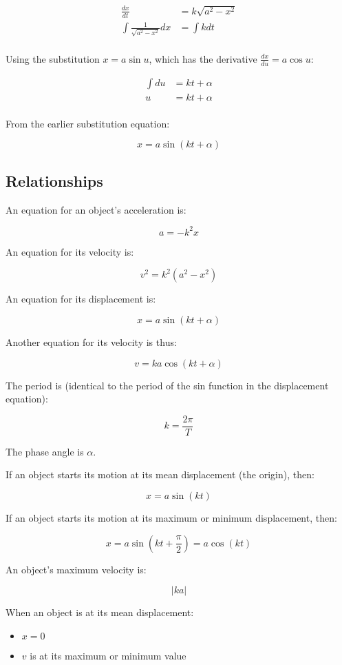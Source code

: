 \documentclass[a4paper,11pt]{report}
\begin{document}
$$
\begin{aligned}
\frac{dx}{dt} & = k\sqrt{a^2 - x^2} \\
\int \frac{1}{\sqrt{a^2 - x^2}} dx & = \int k dt \\
\end{aligned}
$$

Using the substitution $x = a \sin{u}$, which has the derivative
$\frac{dx}{du} = a \cos{u}$:

$$
\begin{aligned}
\int du & = kt + \alpha \\
u & = kt + \alpha \\
\end{aligned}
$$

From the earlier substitution equation:

$$
x = a \sin(kt + \alpha)
$$

\subsection{Relationships}

An equation for an object's acceleration is:

$$
a = -k^2 x
$$

An equation for its velocity is:

$$
v^2 = k^2(a^2 - x^2)
$$

An equation for its displacement is:

$$
x = a \sin(kt + \alpha)
$$

Another equation for its velocity is thus:

$$
v = ka \cos(kt + \alpha)
$$

The period is (identical to the period of the sin function in the displacement
equation):

$$
k = \frac{2\pi}{T}
$$

The phase angle is $\alpha$.

If an object starts its motion at its mean displacement (the origin), then:

$$
x = a \sin(kt)
$$

If an object starts its motion at its maximum or minimum displacement, then:

$$
x = a \sin(kt + \frac{\pi}{2}) = a \cos(kt)
$$

An object's maximum velocity is:

$$
|ka|
$$

When an object is at its mean displacement:

\begin{itemize}
\item $x = 0$
\item $v$ is at its maximum or minimum value
\end{itemize}
\end{document}
